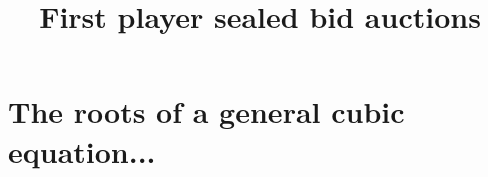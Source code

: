 \documentclass{article}
\title{First player sealed bid auctions}
\date{}
\begin{document}
\maketitle

\section{The roots of a general cubic equation...}
\end{document}
